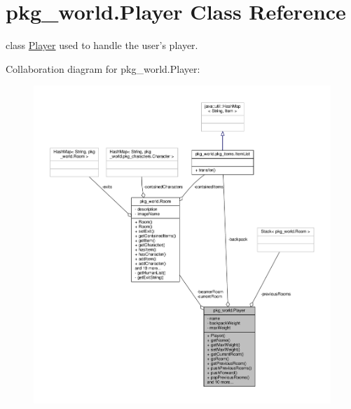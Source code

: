 \hypertarget{classpkg__world_1_1Player}{\section{pkg\-\_\-world.\-Player Class Reference}
\label{classpkg__world_1_1Player}
}


class \hyperlink{classpkg__world_1_1Player}{Player} used to handle the user's player.  




Collaboration diagram for pkg\-\_\-world.\-Player\-:
\nopagebreak
\begin{figure}[H]
\begin{center}
\leavevmode
\includegraphics[width=350pt]{classpkg__world_1_1Player__coll__graph}
\end{center}
\end{figure}
